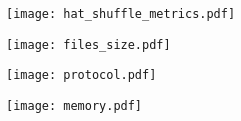 \documentclass[12pt,oneside,onecolumn,a4paper]{article}
\begin{document}

\begin{figure}[t]
\hspace*{-2cm}
\texttt{[image: hat\_shuffle\_metrics.pdf]}
\end{figure}

\begin{figure}[t]
\begin{center}
\leavevmode
\texttt{[image: files\_size.pdf]}
\end{center}
\end{figure}

\begin{figure}[t]
\begin{center}
\leavevmode
\texttt{[image: protocol.pdf]}
\end{center}
\end{figure}

\begin{figure}[t]
\begin{center}
\leavevmode
\texttt{[image: memory.pdf]}
\end{center}
\end{figure}
\end{document}
